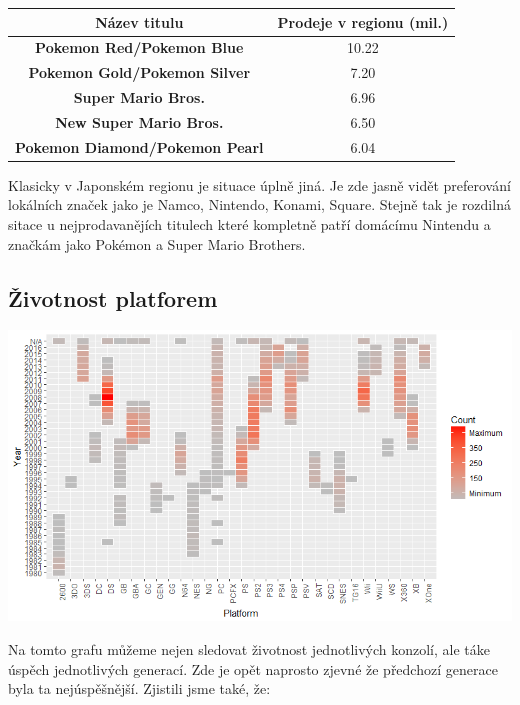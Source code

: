 \documentclass[a4paper,11pt]{article}
\begin{document}
\begin{center}
\begin{tabular}{|c|c|}
\hline
\textbf{Název titulu}                  & \textbf{Prodeje v regionu (mil.)} \\ \hline
\textbf{Pokemon Red/Pokemon Blue}      & 10.22                             \\ \hline
\textbf{Pokemon Gold/Pokemon Silver}   & 7.20                              \\ \hline
\textbf{Super Mario Bros.}             & 6.96                              \\ \hline
\textbf{New Super Mario Bros.}         & 6.50                              \\ \hline
\textbf{Pokemon Diamond/Pokemon Pearl} & 6.04                              \\ \hline
\end{tabular}
\end{center}

Klasicky v Japonském regionu je situace úplně jiná. Je zde jasně vidět preferování lokálních značek jako je Namco, Nintendo, Konami, Square. Stejně tak je rozdilná sitace u nejprodavanějích titulech které kompletně patří domácímu Nintendu a značkám jako Pokémon a Super Mario Brothers.

\newpage


\subsection{Životnost platforem}

\includegraphics[scale=0.75]{Rplot07}

Na tomto grafu můžeme nejen sledovat životnost jednotlivých konzolí, ale táke úspěch jednotlivých generací. Zde je opět naprosto zjevné že předchozí generace byla ta  nejúspěšnější. Zjistili jsme také, že:
\end{document}

